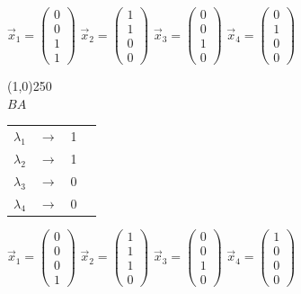 \documentclass[12pt]{scrreprt}
\begin{document}
  \begin{center}
  $\vec{x}_1 = \begin{pmatrix}0\\ 0 \\ 1 \\ 1 \end{pmatrix}$
  $\vec{x}_2 = \begin{pmatrix}1\\ 1 \\ 0 \\ 0 \end{pmatrix}$
  $\vec{x}_3 = \begin{pmatrix}0\\ 0 \\ 1 \\ 0 \end{pmatrix}$
  $\vec{x}_4 = \begin{pmatrix}0\\ 1 \\ 0 \\ 0 \end{pmatrix}$
  \end{center}

  \begin{center}
  \line(1,0){250}\\
  \textbf{$BA$}
  \end{center}

  \begin{center}
  \begin{tabular}{ c c c p{5cm} }
    $\lambda_1$ & $\rightarrow$ & 1 \\        
    $\lambda_2$ & $\rightarrow$ & 1 \\
    $\lambda_3$ & $\rightarrow$ & 0 \\
    $\lambda_4$ & $\rightarrow$ & 0 \\
  \end{tabular}
  \end{center}

  \begin{center}
  $\vec{x}_1 = \begin{pmatrix}0\\ 0 \\ 0 \\ 1 \end{pmatrix}$
  $\vec{x}_2 = \begin{pmatrix}1\\ 1 \\ 1 \\ 0 \end{pmatrix}$
  $\vec{x}_3 = \begin{pmatrix}0\\ 0 \\ 1 \\ 0 \end{pmatrix}$
  $\vec{x}_4 = \begin{pmatrix}1\\ 0 \\ 0 \\ 0 \end{pmatrix}$
  \end{center}
\end{document}
